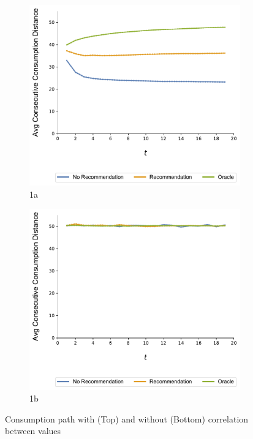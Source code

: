 \documentclass[format=acmsmall, review=false]{acmart}
\begin{document}
\begin{figure}
\begin{subfigure}{.5\linewidth}
  \centering
  \includegraphics[width=.8\linewidth]{figures/rho_pos_consumption_dist_N_200T_20_overall.pdf}
  \caption{1a}
  \label{fig:sfig1}
\end{subfigure}%
\begin{subfigure}{.5\linewidth}
  \centering
  \includegraphics[width=.8\linewidth]{figures/rho_zero_consumption_dist_N_200T_20_overall.pdf}
  \caption{1b}
  \label{fig:sfig2}
\end{subfigure}
\caption{Consumption path with (Top) and without (Bottom) correlation between values}
\label{fig:correlation_consumption_path}
\end{figure}
\end{document}
